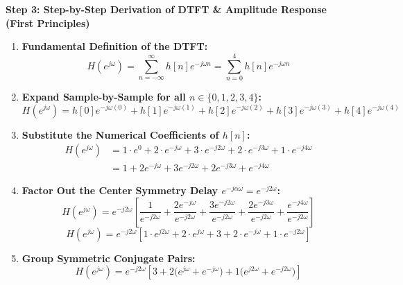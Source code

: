 \documentclass[11pt,a4paper]{article}
\begin{document}
\vspace{1mm}
\noindent\textbf{Step 3: Step-by-Step Derivation of DTFT \& Amplitude Response (First Principles)}
\begin{enumerate}
    \item \textbf{Fundamental Definition of the DTFT:}
    \begin{equation}
    H(e^{j\omega}) = \sum_{n=-\infty}^{\infty} h[n] e^{-j\omega n} = \sum_{n=0}^{4} h[n] e^{-j\omega n}
    \end{equation}

    \item \textbf{Expand Sample-by-Sample for all $n \in \{0, 1, 2, 3, 4\}$:}
    \begin{equation}
    H(e^{j\omega}) = h[0] e^{-j\omega(0)} + h[1] e^{-j\omega(1)} + h[2] e^{-j\omega(2)} + h[3] e^{-j\omega(3)} + h[4] e^{-j\omega(4)}
    \end{equation}

    \item \textbf{Substitute the Numerical Coefficients of $h[n]$:}
    \begin{align}
    H(e^{j\omega}) &= 1\cdot e^{0} + 2\cdot e^{-j\omega} + 3\cdot e^{-j2\omega} + 2\cdot e^{-j3\omega} + 1\cdot e^{-j4\omega} \nonumber \\
    &= 1 + 2e^{-j\omega} + 3e^{-j2\omega} + 2e^{-j3\omega} + e^{-j4\omega}
    \end{align}

    \item \textbf{Factor Out the Center Symmetry Delay $e^{-j\alpha\omega} = e^{-j2\omega}$:}
    \begin{equation}
    H(e^{j\omega}) = e^{-j2\omega} \left[ \frac{1}{e^{-j2\omega}} + \frac{2e^{-j\omega}}{e^{-j2\omega}} + \frac{3e^{-j2\omega}}{e^{-j2\omega}} + \frac{2e^{-j3\omega}}{e^{-j2\omega}} + \frac{e^{-j4\omega}}{e^{-j2\omega}} \right]
    \end{equation}
    \begin{equation}
    H(e^{j\omega}) = e^{-j2\omega} \left[ 1\cdot e^{j2\omega} + 2\cdot e^{j\omega} + 3 + 2\cdot e^{-j\omega} + 1\cdot e^{-j2\omega} \right]
    \end{equation}

    \item \textbf{Group Symmetric Conjugate Pairs:}
    \begin{equation}
    H(e^{j\omega}) = e^{-j2\omega} \left[ 3 + 2\big(e^{j\omega} + e^{-j\omega}\big) + 1\big(e^{j2\omega} + e^{-j2\omega}\big) \right]
    \end{equation}


\end{enumerate}
\end{document}
